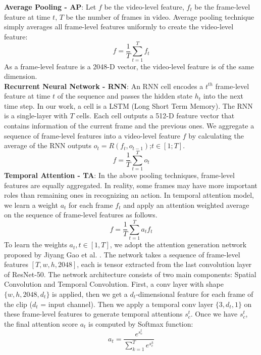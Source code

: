     \textbf{Average Pooling - AP}: Let ${f}$ be the video-level feature, ${f_t}$ be the frame-level feature at time ${t}$, $T$ be the number of frames in video. Average pooling technique simply averages all frame-level features uniformly to create the video-level feature:
    \begin{equation}
    f=\frac{1}{T}\sum_{t=1}^T{f_t}
    \end{equation}
    As a frame-level feature is a 2048-D vector, the video-level feature is of the same dimension.\\
    \textbf{Recurrent Neural Network - RNN}: An RNN cell encodes a $t^{th}$ frame-level feature at time $t$ of the sequence and passes the hidden state $h_t$ into the next time step. In our work, a cell is a LSTM (Long Short Term Memory). The RNN is a single-layer with $T$ cells. Each cell outputs a 512-D feature vector that contains information of the current frame and the previous ones. We aggregate a sequence of frame-level features into a video-level feature $f$ by calculating the average of the RNN outputs $o_t = R(f_t, o_{t-1})$;$t \in [1;T]$. 
    \begin{equation}
    f=\frac{1}{T}\sum_{t=1}^T{o_t}
    \end{equation}
    \textbf{Temporal Attention - TA}: In the above pooling techniques, frame-level features are equally aggregated. In reality, some frames may have more important roles than remaining ones in recognizing an action. In temporal attention model, we learn a weight $a_t$ for each frame $f_t$ and apply an attention weighted average on the sequence of frame-level features as follows.
    \begin{equation}
    f=\frac{1}{T} \sum_{t=1}^{T}a_{t}f_{t}
    \end{equation}
    To learn the weights $a_t, t \in [1,T]$, we adopt the attention generation network proposed by Jiyang Gao et al. \cite{gao2018revisiting}. The network takes a sequence of frame-level features $[T, w, h, 2048]$, each is tensor extracted from the last convolution layer of ResNet-50. The network architecture consists of two main components: Spatial Convolution and Temporal Convolution. First, a conv layer with shape $\{w,h,2048,d_t\}$ is applied, then we get a $d_t$-dimensional feature for each frame of the clip ($d_t$ = input channel). Then we apply a temporal conv layer $\{3,d_t, 1\}$ on these frame-level features to generate temporal attentions $s_c^t$. Once we have $s_c^t$, the final attention score $a_t$ is computed by Softmax function: 
    \begin{equation}
    a_t = \frac{e^{s_c^t}}{\sum_{k=1}^{T}e^{s_c^k}}
    \end{equation}
